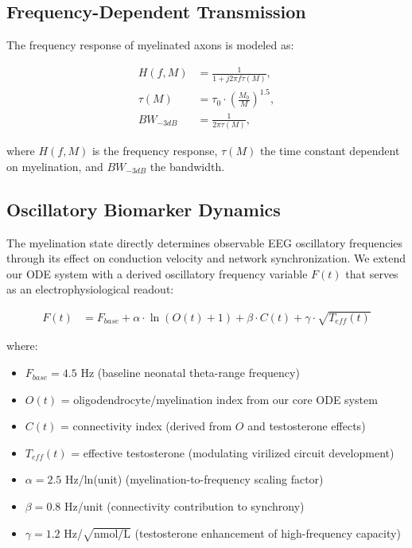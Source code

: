 \documentclass[11pt]{article}
\let\oldsubsection\subsection
\renewcommand{\subsection}[1]{\oldsubsection{#1}\setlength{\leftskip}{0.75em}}
\begin{document}
\subsection{Frequency-Dependent Transmission}
The frequency response of myelinated axons is modeled as:

\begin{align}
H(f,M) &= \frac{1}{1 + j2\pi f \tau(M)}, \\
\tau(M) &= \tau_0 \cdot \left(\frac{M_0}{M}\right)^{1.5}, \\
BW_{-3dB} &= \frac{1}{2\pi\tau(M)},
\end{align}

where $H(f,M)$ is the frequency response, $\tau(M)$ the time constant dependent on myelination, and $BW_{-3dB}$ the bandwidth.

\subsection{Oscillatory Biomarker Dynamics}

The myelination state directly determines observable EEG oscillatory frequencies through its effect on conduction velocity and network synchronization. We extend our ODE system with a derived oscillatory frequency variable $F(t)$ that serves as an electrophysiological readout:

\begin{align}
F(t) &= F_{base} + \alpha \cdot \ln(O(t) + 1) + \beta \cdot C(t) + \gamma \cdot \sqrt{T_{eff}(t)}
\end{align}

where:
\begin{itemize}
\item $F_{base} = 4.5$ Hz (baseline neonatal theta-range frequency)
\item $O(t)$ = oligodendrocyte/myelination index from our core ODE system
\item $C(t)$ = connectivity index (derived from $O$ and testosterone effects)
\item $T_{eff}(t)$ = effective testosterone (modulating virilized circuit development)
\item $\alpha = 2.5$ Hz/ln(unit) (myelination-to-frequency scaling factor)
\item $\beta = 0.8$ Hz/unit (connectivity contribution to synchrony)
\item $\gamma = 1.2$ Hz/$\sqrt{\text{nmol/L}}$ (testosterone enhancement of high-frequency capacity)
\end{itemize}
\end{document}
